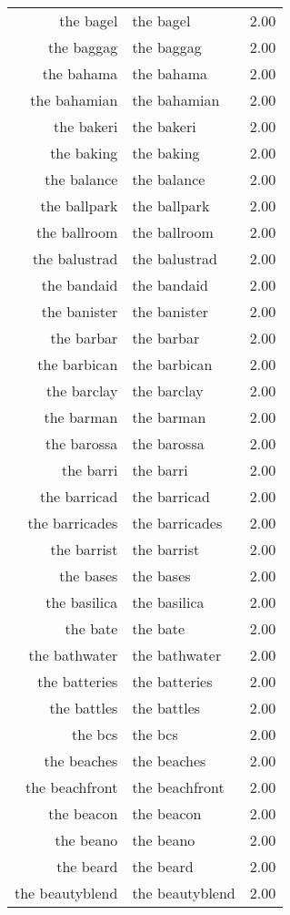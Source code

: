 \begin{table}[ht]
\begin{tabular}{rlr}
  the bagel & the bagel & 2.00 \\ 
  the baggag & the baggag & 2.00 \\ 
  the bahama & the bahama & 2.00 \\ 
  the bahamian & the bahamian & 2.00 \\ 
  the bakeri & the bakeri & 2.00 \\ 
  the baking & the baking & 2.00 \\ 
  the balance & the balance & 2.00 \\ 
  the ballpark & the ballpark & 2.00 \\ 
  the ballroom & the ballroom & 2.00 \\ 
  the balustrad & the balustrad & 2.00 \\ 
  the bandaid & the bandaid & 2.00 \\ 
  the banister & the banister & 2.00 \\ 
  the barbar & the barbar & 2.00 \\ 
  the barbican & the barbican & 2.00 \\ 
  the barclay & the barclay & 2.00 \\ 
  the barman & the barman & 2.00 \\ 
  the barossa & the barossa & 2.00 \\ 
  the barri & the barri & 2.00 \\ 
  the barricad & the barricad & 2.00 \\ 
  the barricades & the barricades & 2.00 \\ 
  the barrist & the barrist & 2.00 \\ 
  the bases & the bases & 2.00 \\ 
  the basilica & the basilica & 2.00 \\ 
  the bate & the bate & 2.00 \\ 
  the bathwater & the bathwater & 2.00 \\ 
  the batteries & the batteries & 2.00 \\ 
  the battles & the battles & 2.00 \\ 
  the bcs & the bcs & 2.00 \\ 
  the beaches & the beaches & 2.00 \\ 
  the beachfront & the beachfront & 2.00 \\ 
  the beacon & the beacon & 2.00 \\ 
  the beano & the beano & 2.00 \\ 
  the beard & the beard & 2.00 \\ 
  the beautyblend & the beautyblend & 2.00 \\ 

\end{tabular}
\end{table}
